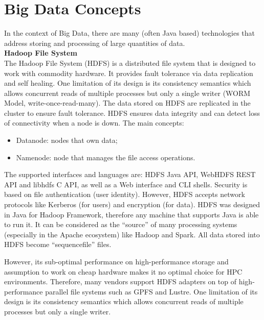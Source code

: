 \section{Big Data Concepts}

In the context of Big Data, there are many (often Java based) technologies that address storing and processing of large quantities of data. \\

\textbf{Hadoop File System}\\
The Hadoop File System (HDFS) is a distributed file system that is designed to work with commodity hardware.
It provides fault tolerance via data replication and self healing.
One limitation of its design is its consistency semantics which allows concurrent reads of multiple processes but only a single writer (WORM Model, write-once-read-many).
The data stored on HDFS are replicated in the cluster to ensure fault tolerance.
HDFS ensures data integrity and can detect loss of connectivity when a node is down.
The main concepts:

\begin{itemize}
	\item Datanode: nodes that own data;
	\item Namenode: node that manages the file access operations.
\end{itemize}

The supported interfaces and languages are: HDFS Java API, WebHDFS REST API and libhdfs C API, as well as a Web interface and CLI shells.
Security is based on file authentication (user identity). However, HDFS accepts network protocols like Kerberos (for users) and encryption (for data).
HDFS was designed in Java for Hadoop Framework, therefore any machine that supports Java is able to run it.
It can be considered as the ``source'' of many processing systems (especially in the Apache ecosystem) like Hadoop and Spark. All data stored into HDFS become ``sequencefile'' files.

However, its sub-optimal performance on high-performance storage and assumption to work on cheap hardware makes it no optimal choice for HPC environments.
Therefore, many vendors support HDFS adapters on top of high-performance parallel file systems such as GPFS and Lustre.
One limitation of its design is its consistency semantics which allows concurrent reads of multiple processes but only a single writer.
\\

